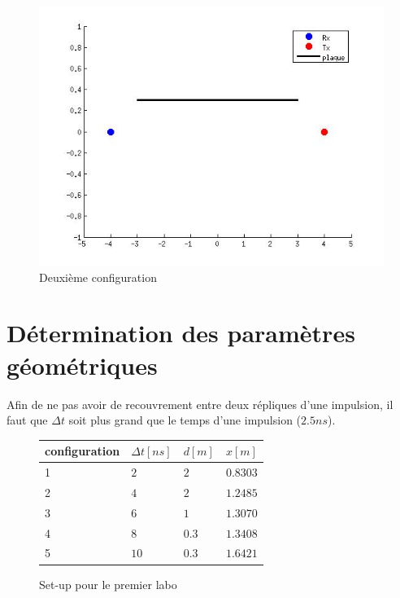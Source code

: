 \documentclass[10pt,a4paper]{article}
\begin{document}
	\begin{figure}[h]
	\centering
	\includegraphics[scale=0.4]{conf2.jpg}
	\caption{Deuxième configuration \label{conf2}}
	\end{figure}		
	
	
	\section{Détermination des paramètres géométriques}
		Afin de ne pas avoir de recouvrement entre deux répliques d'une impulsion, il faut que $\Delta t$ soit plus grand que le temps d'une impulsion ($2.5ns$).
		
		
		\begin{figure}[h]
		\centering
		\begin{tabular}{|l|l|l|l|}
		\hline
		 configuration & $\Delta t [ns]$ & $d [m]$ & $x [m]$ \\
		 \hline
		 1 & $2$ & $2$ & $0.8303$ \\
		 2 & $4$ & $2$ & $1.2485$ \\
		 3 & $6$ & $1$ & $1.3070$ \\
		 4 & $8$ & $0.3$ & $1.3408$ \\
		 5 & $10$ & $0.3$ & $1.6421$ \\
		 \hline
		\end{tabular}
		
		\caption{Set-up pour le premier labo}
		\end{figure}
\end{document}
